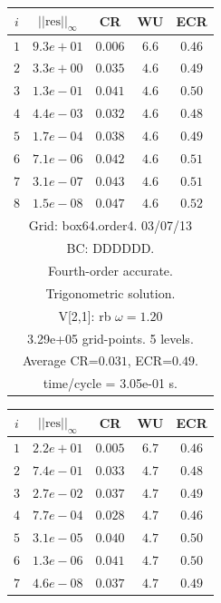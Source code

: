 \begin{table}[hbt]
\begin{center}
\begin{tabular}{|c|c|c|c|c|}
\hline 
\end{tabular}
\begin{tabular}{|c|c|c|c|c|} \hline 
 $i$   & $\vert\vert\mbox{res}\vert\vert_\infty$  &  CR     &  WU    & ECR  \\   \hline 
 $ 1$  & $ 9.3e+01$ & $0.006$ & $ 6.6$ & $0.46$ \\ 
 $ 2$  & $ 3.3e+00$ & $0.035$ & $ 4.6$ & $0.49$ \\ 
 $ 3$  & $ 1.3e-01$ & $0.041$ & $ 4.6$ & $0.50$ \\ 
 $ 4$  & $ 4.4e-03$ & $0.032$ & $ 4.6$ & $0.48$ \\ 
 $ 5$  & $ 1.7e-04$ & $0.038$ & $ 4.6$ & $0.49$ \\ 
 $ 6$  & $ 7.1e-06$ & $0.042$ & $ 4.6$ & $0.51$ \\ 
 $ 7$  & $ 3.1e-07$ & $0.043$ & $ 4.6$ & $0.51$ \\ 
 $ 8$  & $ 1.5e-08$ & $0.047$ & $ 4.6$ & $0.52$ \\ 
\hline 
\multicolumn{5}{|c|}{Grid: box64.order4. 03/07/13}  \\
\multicolumn{5}{|c|}{BC: DDDDDD.}  \\
\multicolumn{5}{|c|}{Fourth-order accurate.}  \\
\multicolumn{5}{|c|}{Trigonometric solution.}  \\
\multicolumn{5}{|c|}{V[2,1]: rb $\omega=1.20$}  \\
\multicolumn{5}{|c|}{3.29e+05 grid-points. 5 levels.}  \\
\multicolumn{5}{|c|}{Average CR=$0.031$, ECR=$0.49$.}  \\
\multicolumn{5}{|c|}{time/cycle = 3.05e-01 s.}  \\
\hline 
\end{tabular}
\begin{tabular}{|c|c|c|c|c|} \hline 
 $i$   & $\vert\vert\mbox{res}\vert\vert_\infty$  &  CR     &  WU    & ECR  \\   \hline 
 $ 1$  & $ 2.2e+01$ & $0.005$ & $ 6.7$ & $0.46$ \\ 
 $ 2$  & $ 7.4e-01$ & $0.033$ & $ 4.7$ & $0.48$ \\ 
 $ 3$  & $ 2.7e-02$ & $0.037$ & $ 4.7$ & $0.49$ \\ 
 $ 4$  & $ 7.7e-04$ & $0.028$ & $ 4.7$ & $0.46$ \\ 
 $ 5$  & $ 3.1e-05$ & $0.040$ & $ 4.7$ & $0.50$ \\ 
 $ 6$  & $ 1.3e-06$ & $0.041$ & $ 4.7$ & $0.50$ \\ 
 $ 7$  & $ 4.6e-08$ & $0.037$ & $ 4.7$ & $0.49$ \\ 

\end{tabular}
\end{center}
\end{table}
